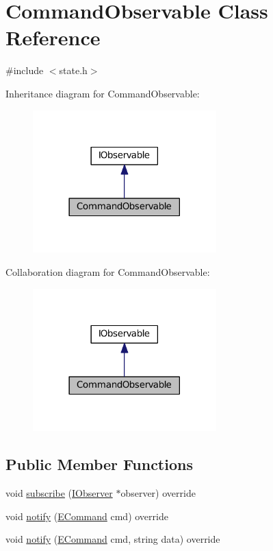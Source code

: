 \hypertarget{class_command_observable}{}\section{Command\+Observable Class Reference}
\label{class_command_observable}


{\ttfamily \#include $<$state.\+h$>$}



Inheritance diagram for Command\+Observable\+:
\nopagebreak
\begin{figure}[H]
\begin{center}
\leavevmode
\includegraphics[width=201pt]{class_command_observable__inherit__graph}
\end{center}
\end{figure}


Collaboration diagram for Command\+Observable\+:
\nopagebreak
\begin{figure}[H]
\begin{center}
\leavevmode
\includegraphics[width=201pt]{class_command_observable__coll__graph}
\end{center}
\end{figure}
\subsection*{Public Member Functions}
\begin{DoxyCompactItemize}
\item 
void \hyperlink{class_command_observable_ad8bc68d264feb6c62ba2964e57c7c1ac}{subscribe} (\hyperlink{struct_i_observer}{I\+Observer} $\ast$observer) override
\item 
void \hyperlink{class_command_observable_a6df1f72513d0964125e6eec93a861335}{notify} (\hyperlink{interface_8h_aa299181f275f76f11365a410f7429098}{E\+Command} cmd) override
\item 
void \hyperlink{class_command_observable_ae1da1f83ac5b27fc0d6dbaa5dd1e773b}{notify} (\hyperlink{interface_8h_aa299181f275f76f11365a410f7429098}{E\+Command} cmd, string data) override
\end{DoxyCompactItemize}


